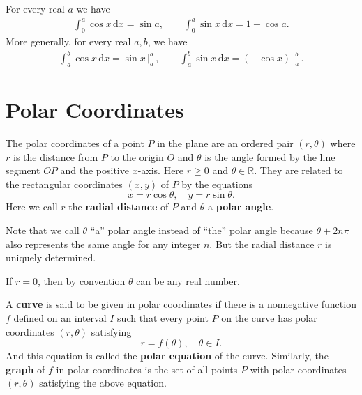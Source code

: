 	\begin{theoremenv}
		For every real $a$ we have
		\begin{align*}
			\int_0^a \cos x\,\mathrm{d}x = \sin a,\qquad
			\int_0^a \sin x\, \mathrm{d}x = 1-\cos a.
		\end{align*}
		More generally, for every real $a,b$, we have
		\begin{align*}
			\int_a^b \cos x\,\mathrm{d}x = \sin x\,\Big|^b_a\, ,\qquad
			\int_a^b \sin x\, \mathrm{d}x = (-\cos x)\, \Big|^b_a\, .
		\end{align*}
	\end{theoremenv}

	\section{Polar Coordinates}
	\begin{definitionenv}
		The polar coordinates of a point $P$ in the plane are an ordered pair $(r,\theta)$ where $r$ is the distance from $P$ to the origin $O$ and $\theta$ is the angle formed by the line segment $OP$ and the positive $x$-axis. Here $r\ge 0$ and $\theta\in \mathbb{R}$. They are related to the rectangular coordinates $(x,y)$ of $P$ by the equations
		\[
		x=r\cos \theta,\quad y=r\sin \theta.
		\]
		Here we call $r$ the \textbf{radial distance} of $P$ and $\theta$ a \textbf{polar angle}.
	\end{definitionenv}
	\begin{remarkenv}
		Note that we call $\theta$ ``a'' polar angle instead of ``the'' polar angle because $\theta+2n\pi$ also represents the same angle for any integer $n$. But the radial distance $r$ is uniquely determined. 
		
		If $r=0$, then by convention $\theta$ can be any real number.
	\end{remarkenv}
	\begin{definitionenv}
		A \textbf{curve} is said to be given in polar coordinates if there is a nonnegative function $f$ defined on an interval $I$ such that every point $P$ on the curve has polar coordinates $(r,\theta)$ satisfying
		\[
		r=f(\theta),\quad \theta\in I.
		\]
		And this equation is called the \textbf{polar equation} of the curve. Similarly, the \textbf{graph} of $f$ in polar coordinates is the set of all points $P$ with polar coordinates $(r,\theta)$ satisfying the above equation.
	\end{definitionenv}


